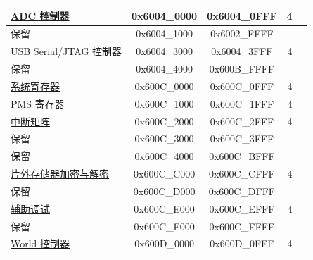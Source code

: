 \begin{longtable}[c]{ |p{5cm}|c|c|r|p{1.0cm}| }
                        \hyperref[mod:sensor]{ADC 控制器}              & 0x6004\_0000 & 0x6004\_0FFF &   4    &   \\\hline
    \rowcolor{gray!25}  保留                    & 0x6004\_1000 & 0x6002\_FFFF &        &   \\\hline
                        \hyperref[mod:usbserialjtag]{USB Serial/JTAG 控制器}  & 0x6004\_3000 & 0x6004\_3FFF &   4    &  \\\hline
    \rowcolor{gray!25}  保留                    & 0x6004\_4000 & 0x600B\_FFFF &        &   \\\hline
                        
                        \hyperref[mod:sysreg]{系统寄存器}              & 0x600C\_0000 & 0x600C\_0FFF &   4    &   \\\hline
                        \hyperref[mod:permctrl]{PMS 寄存器}     & 0x600C\_1000 & 0x600C\_1FFF &   4    &   \\\hline 
                        \hyperref[mod:intmtrx]{中断矩阵}                & 0x600C\_2000 & 0x600C\_2FFF &   4    &   \\\hline
    \rowcolor{gray!25}  保留                    & 0x600C\_3000 & 0x600C\_3FFF &        &   \\\hline
    \rowcolor{gray!25}  保留         & 0x600C\_4000 & 0x600C\_BFFF &      &   \\\hline
                        \hyperref[mod:extmemencr]{片外存储器加密与解密}    & 0x600C\_C000 & 0x600C\_CFFF &   4    &   \\\hline
    \rowcolor{gray!25}  保留                    & 0x600C\_D000 & 0x600C\_DFFF &        &   \\\hline
                        \hyperref[mod:dbgassist]{辅助调试}                & 0x600C\_E000 & 0x600C\_EFFF &   4    &   \\\hline
    \rowcolor{gray!25}  保留                    & 0x600C\_F000 & 0x600C\_FFFF &        &   \\\hline
                       \hyperref[mod:wctrl]{World 控制器}            & 0x600D\_0000 & 0x600D\_0FFF &   4    &   \\\hline
    
\end{longtable}


